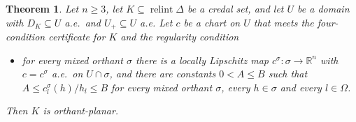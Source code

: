 \documentclass[11pt]{article}
\newcommand{\R}{\mathbb{R}}
\DeclareMathOperator{\relint}{relint}
\theoremstyle{plain}
\newtheorem{theorem}{Theorem}[section]
\theoremstyle{definition}
\theoremstyle{remark}
\begin{document}
\begin{theorem}\label{thm:chartrigid}
Let $n\ge3$, let $K\subseteq\relint\Delta$ be a credal set, and let $U$ be a domain with
$D_K\subseteq U$ a.e.\ and $U_+\subseteq U$ a.e. Let $c$ be a chart on $U$ that meets the
four-condition certificate for $K$ and the regularity condition
\begin{itemize}
  \item[(Reg)] for every mixed orthant $\sigma$ there is a locally Lipschitz map
  $c^\sigma:\sigma\to\R^n$ with $c=c^\sigma$ a.e.\ on $U\cap\sigma$, and there are
  constants $0<A\le B$ such that $A\le c^\sigma_l(h)/h_l\le B$ for every mixed orthant
  $\sigma$, every $h\in\sigma$ and every $l\in\Omega$.
\end{itemize}
Then $K$ is orthant-planar.
\end{theorem}
\end{document}
